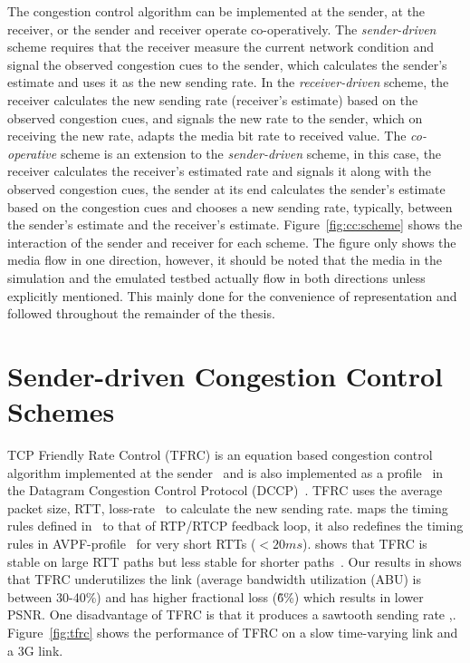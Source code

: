 The congestion control algorithm can be implemented at the sender, at the
receiver, or the sender and receiver operate co-operatively. The
\emph{sender-driven} scheme requires that the receiver measure the current
network condition and signal the observed congestion cues to the sender, which
calculates the sender's estimate and uses it as the new sending rate. In the
\emph{receiver-driven} scheme, the receiver calculates the new sending rate
(receiver's estimate) based on the observed congestion cues, and signals the
new rate to the sender, which on receiving the new rate, adapts the media bit
rate to received value. The \emph{co-operative} scheme is an extension to the
\emph{sender-driven} scheme, in this case, the receiver calculates the
receiver's estimated rate and signals it along with the observed congestion
cues, the sender at its end calculates the sender's estimate based on the
congestion cues and chooses a new sending rate, typically, between the
sender's estimate and the receiver's estimate. Figure~\ref{fig:cc:scheme}
shows the interaction of the sender and receiver for each scheme. The figure
only shows the media flow in one direction, however, it should be noted that
the media in the simulation and the emulated testbed actually flow in both
directions unless explicitly mentioned. This mainly done for the convenience
of representation and followed throughout the remainder of the thesis.



\section{Sender-driven Congestion Control Schemes}

TCP Friendly Rate Control (TFRC) is an equation based congestion control
algorithm implemented at the sender~\cite{tfrc_347397} and is also implemented
as a profile~\cite{rfc4342} in the Datagram Congestion Control Protocol
(DCCP)~\cite{rfc4340}. TFRC uses the average packet size, RTT,
loss-rate~\cite{rfc3448} to calculate the new sending rate.
\cite{draft.rtp.tfrc} maps the timing rules defined in~\cite{rfc4828, rfc5348}
to that of RTP/RTCP feedback loop, it also redefines the timing rules in
AVPF-profile~\cite{rfc4585} for very short RTTs ($<20ms$).
\cite{Gharai06:ICME} shows that TFRC is stable on large RTT paths but less
stable for shorter paths~\cite{saurin:2006:thesis}. Our results in
 shows that TFRC underutilizes the link (average bandwidth
utilization (ABU) is between 30-40\%) and has higher fractional loss (\~6\%)
which results in lower PSNR. One disadvantage of TFRC is that it produces a
sawtooth sending rate \cite{saurin:2006:thesis},.
Figure~\ref{fig:tfrc} shows the performance of TFRC on a slow time-varying
link and a 3G link.

